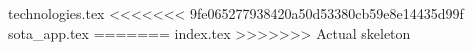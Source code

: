 {technologies.tex}
<<<<<<< 9fe065277938420a50d53380cb59e8e14435d99f
{sota_app.tex}
=======
{index.tex}
>>>>>>> Actual skeleton
